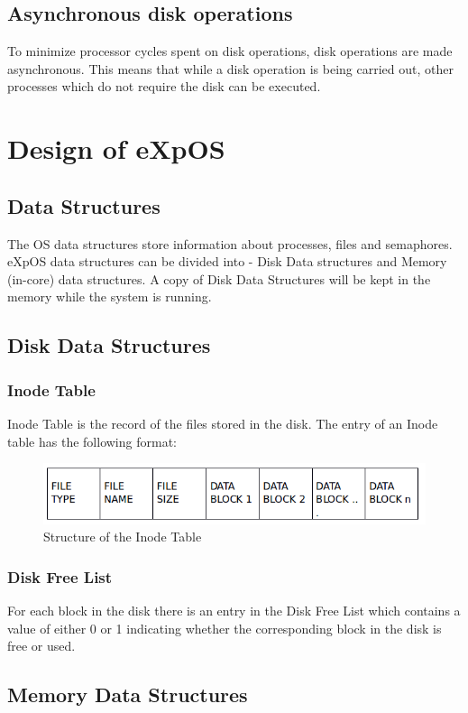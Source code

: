 \documentclass[11pt ,twosided]{article}
\begin{document}
\subsection{Asynchronous disk operations}

To minimize processor cycles spent on disk operations, disk operations are made asynchronous. This means that while a disk operation is being carried out, other processes which do not require the disk can be executed.
\section{Design of eXpOS}
\subsection{Data Structures}

The OS data structures store information about processes, files and semaphores. eXpOS data structures can be divided into - Disk Data structures and Memory (in-core) data structures. A copy of Disk Data Structures will be kept in the memory while the system is running.
\subsection{Disk Data Structures}
\subsubsection{Inode Table}

Inode Table is the record of the files stored in the disk. The entry of an Inode table has the following format:
\begin{figure}[ht]
\centering
\includegraphics[scale=0.60]{Inode_table.png}
\caption{\footnotesize Structure of the Inode Table}
\label{fig_1}
\end{figure}
\subsubsection{Disk Free List}

For each block in the disk there is an entry in the Disk Free List which contains a value of either 0 or 1 indicating whether the corresponding block in the disk is free or used.
\subsection{Memory Data Structures}
\end{document}
